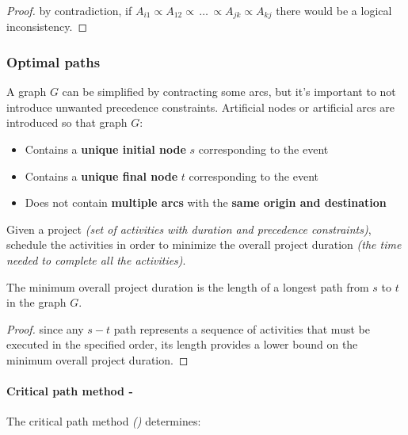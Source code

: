 \documentclass[english]{article}
\begin{document}
\begin{proof}
  by contradiction, if \(A_{i1} \propto A_{12} \propto \, \ldots \, \propto A_{jk} \propto A_{kj}\) there would be a logical inconsistency.
\end{proof}

\subsubsection{Optimal paths}

A graph \(G\) can be simplified by contracting some arcs, but it's important to not introduce unwanted precedence constraints.
Artificial nodes or artificial arcs are introduced so that graph \(G\):

\begin{itemize}
  \item Contains a \textbf{unique initial node} \(s\) corresponding to the event 
  \item Contains a \textbf{unique final node} \(t\) corresponding to the event 
  \item Does not contain \textbf{multiple arcs} with the \textbf{same origin and destination}
\end{itemize}

\bigskip
\begin{problem}
Given a project \textit{(set of activities with duration and precedence constraints)}, schedule the activities in order to minimize the overall project duration \textit{(the time needed to complete all the activities)}.
\end{problem}

\bigskip
\begin{property}
  The minimum overall project duration is the length of a longest path from \(s\) to \(t\) in the graph \(G\).
\end{property}

\begin{proof}
  since any \(s-t\) path represents a sequence of activities that must be executed in the specified order, its length provides a lower bound on the minimum overall project duration.
\end{proof}

\paragraph{Critical path method - \CPM}

The critical path method \textit{(\CPM) } determines:
\end{document}
